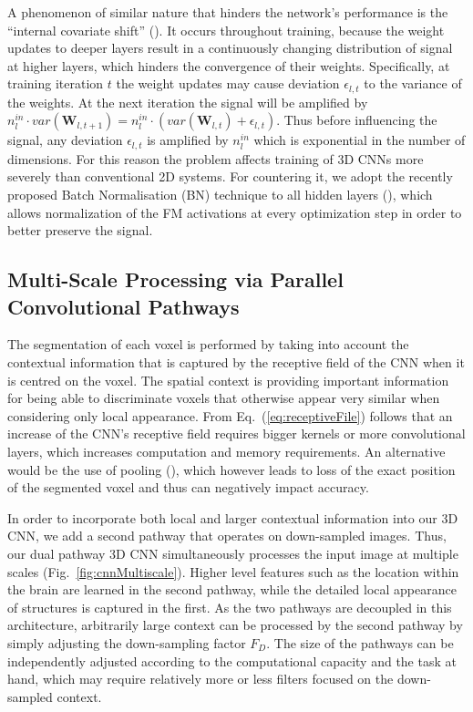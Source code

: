 \documentclass[preprint,authoryear,12pt]{elsarticle}
\newcommand{\quot}[1]{``#1''}
\begin{document}
A phenomenon of similar nature that hinders the network's performance is the \quot{internal covariate shift} (\cite{ioffe2015batch}). It occurs throughout training, because the weight updates to deeper layers result in a continuously changing distribution of signal at higher layers, which hinders the convergence of their weights. Specifically, at training iteration $t$ the weight updates may cause deviation $\epsilon_{l,t}$ to the variance of the weights. At the next iteration the signal will be amplified by $n^{in}_l \cdot var(\mathbf{W}_{l,t+1}) = n^{in}_l \cdot (var(\mathbf{W}_{l,t}) + \epsilon_{l,t})$. Thus before influencing the signal, any deviation $\epsilon_{l,t}$ is amplified by $n^{in}_l$ which is exponential in the number of dimensions. For this reason the problem affects training of 3D CNNs more severely than conventional 2D systems. For countering it, we adopt the recently proposed Batch Normalisation (BN) technique to all hidden layers (\cite{ioffe2015batch}), which allows normalization of the FM activations at every optimization step in order to better preserve the signal.


\subsection{Multi-Scale Processing via Parallel Convolutional Pathways}
\label{subsec:multiscaleCnn}

The segmentation of each voxel is performed by taking into account the contextual information that is captured by the receptive field of the CNN when it is centred on the voxel. The spatial context is providing important information for being able to discriminate voxels that otherwise appear very similar when considering only local appearance. From Eq.~(\ref{eq:receptiveFile}) follows that an increase of the CNN's receptive field requires bigger kernels or more convolutional layers, which increases computation and memory requirements. An alternative would be the use of pooling (\cite{LeCun1998}), which however leads to loss of the exact position of the segmented voxel and thus can negatively impact accuracy.

In order to incorporate both local and larger contextual information into our 3D CNN, we add a second pathway that operates on down-sampled images. Thus, our dual pathway 3D CNN simultaneously processes the input image at multiple scales (Fig.~\ref{fig:cnnMultiscale}). Higher level features such as the location within the brain are learned in the second pathway, while the detailed local appearance of structures is captured in the first. As the two pathways are decoupled in this architecture, arbitrarily large context can be processed by the second pathway by simply adjusting the down-sampling factor $F_D$. The size of the pathways can be independently adjusted according to the computational capacity and the task at hand, which may require relatively more or less filters focused on the down-sampled context.
\end{document}
